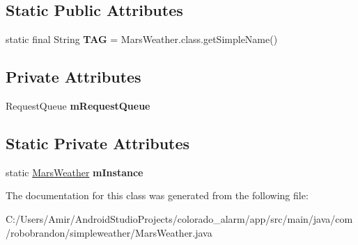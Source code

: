 \subsection*{Static Public Attributes}
\begin{DoxyCompactItemize}
\item 
static final String {\bfseries T\+AG} = Mars\+Weather.\+class.\+get\+Simple\+Name()\hypertarget{classcom_1_1robobrandon_1_1simpleweather_1_1_mars_weather_abe392a74a12221133f20720de89197fb}{}\label{classcom_1_1robobrandon_1_1simpleweather_1_1_mars_weather_abe392a74a12221133f20720de89197fb}

\end{DoxyCompactItemize}
\subsection*{Private Attributes}
\begin{DoxyCompactItemize}
\item 
Request\+Queue {\bfseries m\+Request\+Queue}\hypertarget{classcom_1_1robobrandon_1_1simpleweather_1_1_mars_weather_acca64f45e338b920d17df069e435d7cc}{}\label{classcom_1_1robobrandon_1_1simpleweather_1_1_mars_weather_acca64f45e338b920d17df069e435d7cc}

\end{DoxyCompactItemize}
\subsection*{Static Private Attributes}
\begin{DoxyCompactItemize}
\item 
static \hyperlink{classcom_1_1robobrandon_1_1simpleweather_1_1_mars_weather}{Mars\+Weather} {\bfseries m\+Instance}\hypertarget{classcom_1_1robobrandon_1_1simpleweather_1_1_mars_weather_a3cb4d482a821685011738b6492e6c57c}{}\label{classcom_1_1robobrandon_1_1simpleweather_1_1_mars_weather_a3cb4d482a821685011738b6492e6c57c}

\end{DoxyCompactItemize}


The documentation for this class was generated from the following file\+:\begin{DoxyCompactItemize}
\item 
C\+:/\+Users/\+Amir/\+Android\+Studio\+Projects/colorado\+\_\+alarm/app/src/main/java/com/robobrandon/simpleweather/Mars\+Weather.\+java\end{DoxyCompactItemize}
